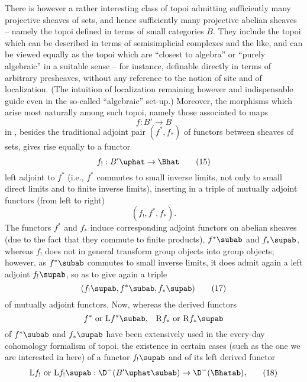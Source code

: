 There is however a rather interesting class of topoi admitting
sufficiently many projective sheaves of sets, and hence
sufficiently many projective abelian sheaves -- namely the topoi
\Bhat{} defined in terms of small categories $B$. They include the
topoi which can be described in terms of semisimplicial complexes and
the like, and can be viewed equally as the topoi which are ``closest
to algebra'' or ``purely algebraic'' in a suitable sense -- for
instance, definable directly in terms of arbitrary presheaves, without
any reference to the notion of site and of localization. (The
intuition of localization remaining however and indispensable guide
even in the so-called ``algebraic'' set-up.) Moreover, the morphisms
which arise most naturally among such topoi, namely those associated
to maps
\[f:B'\to B\]
in \Cat, besides the traditional adjoint pair $(f^*,f_*)$ of functors
between sheaves of sets, gives rise equally to a functor
\begin{equation}
  \label{eq:100.15}
  f_!:{B'}\uphat\to\Bhat\tag{15}
\end{equation}
left adjoint to $f^*$ (i.e., $f^*$ commutes to small inverse limits,
not only to small direct limits and to finite inverse limits),
inserting in a triple of mutually adjoint functors (from left to
right)
\begin{equation}
  \label{eq:100.16}
  (f_!,f^*,f_*).\tag{16}
\end{equation}
The functors $f^*$ and $f_*$ induce corresponding adjoint functors on
abelian sheaves (due to the fact that they commute to finite
products), $f^*\subab$ and $f_*\supab$, whereas $f_!$ does not in
general transform group objects into group objects; however, as
$f^*\subab$ commutes to small inverse limits, it does admit again a
left adjoint $f_!\supab$, so as to give again a triple
\begin{equation}
  \label{eq:100.17}
  (f_!\supab,f^*\subab,f_*\supab)\tag{17}
\end{equation}
of mutually adjoint functors. Now, whereas the derived functors
\[\text{$f^*$ or $\mathrm L f^*\subab$,} \quad
\text{$\mathrm R f_*$ or $\mathrm R f_*\supab$}\]
of $f^*\subab$ and $f_*\supab$ have been extensively used in the
every-day cohomology formalism of topoi, the existence in certain
cases (such as the one we are interested in here) of a functor
$f_!\supab$ and of its left derived functor
\begin{equation}
  \label{eq:100.18}
  \text{$\mathrm L f_!$ or $\mathrm Lf_!\supab: \D^-({B'}\uphat\subab)
    \to \D^-(\Bhatab),$}\tag{18}
\end{equation}
